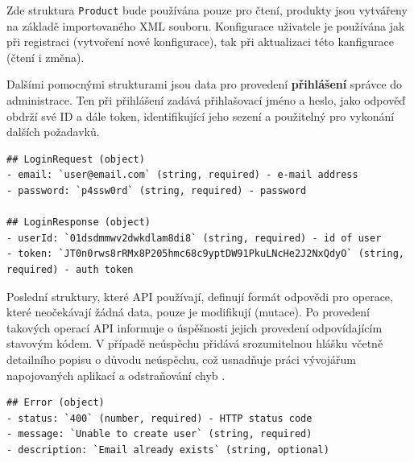 \documentclass[FM,DP]{tulthesis}
\newenvironment{code}
    {\filbreak\captionsetup{type=listing}}{\filbreak}
\begin{document}
Zde struktura \Verb|Product| bude používána pouze pro čtení, produkty jsou vytvářeny
na základě importovaného XML souboru. Konfigurace uživatele je používána jak při
registraci (vytvoření nové konfigurace), tak při aktualizaci této kanfigurace (čtení
i změna).

Dalšími pomocnými strukturami jsou data pro provedení \textbf{přihlášení} správce 
do administrace. Ten při přihlášení zadává přihlašovací jméno a heslo, jako odpověď 
obdrží své ID a dále token, identifikující jeho sezení a použitelný pro vykonání 
dalších požadavků.

\begin{code}
\captionsetup{singlelinecheck=false,justification=raggedright}
\label{code:api-request}
\begin{verbatim}
## LoginRequest (object)
- email: `user@email.com` (string, required) - e-mail address
- password: `p4ssw0rd` (string, required) - password

## LoginResponse (object)
- userId: `01dsdmmwv2dwkdlam8di8` (string, required) - id of user
- token: `JT0n0rws8rRMx8P205hmc68c9yptDW91PkuLNcHe2J2NxQdyO` (string, required) - auth token
\end{verbatim}
\end{code}

Poslední struktury, které API používají, definují formát odpovědi pro operace, které
neočekávají žádná data, pouze je modifikují (mutace). Po provedení takových operací
API informuje o úspěšnosti jejich provedení odpovídajícím stavovým kódem. V případě 
neúspěchu přidává srozumitelnou hlášku včetně detailního popisu o důvodu neúspěchu, 
což usnadňuje práci vývojářum napojovaných aplikací a odstraňování chyb \cite[strana~42]{api}.


\begin{code}
\captionsetup{singlelinecheck=false,justification=raggedright}
\label{code:api-error}
\begin{verbatim}
## Error (object)
- status: `400` (number, required) - HTTP status code
- message: `Unable to create user` (string, required)
- description: `Email already exists` (string, optional)
\end{verbatim}
\end{code}
\end{document}
